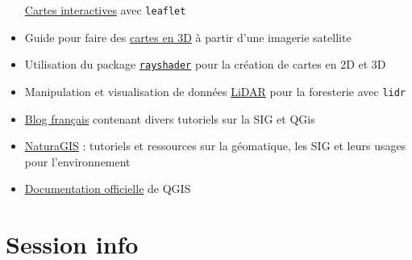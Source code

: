 \documentclass[
  french,
]{book}
\begin{document}
\begin{itemize}
  \href{https://rstudio.github.io/leaflet/}{Cartes interactives} avec \texttt{leaflet}
\item
  Guide pour faire des
  \href{https://www.tylermw.com/a-step-by-step-guide-to-making-3d-maps-with-satellite-imagery-in-r/}{cartes en 3D}
  à partir d'une imagerie satellite
\item
  Utilisation du package \href{https://www.rayshader.com/}{\texttt{rayshader}} pour la
  création de cartes en 2D et 3D
\item
  Manipulation et visualisation de données
  \href{https://github.com/Jean-Romain/lidR}{LiDAR} pour la foresterie avec \texttt{lidr}
\item
  \href{https://www.sigterritoires.fr/index.php/concepts/}{Blog français} contenant
  divers tutoriels sur la SIG et QGis
\item
  \href{https://naturagis.fr/}{NaturaGIS} : tutoriels et ressources sur la géomatique, les SIG et leurs usages pour l'environnement
\item
  \href{https://docs.qgis.org/3.10/fr/docs/}{Documentation officielle} de QGIS
\end{itemize}

\hypertarget{session-info}{%
\chapter*{Session info}\label{session-info}}
\end{document}
